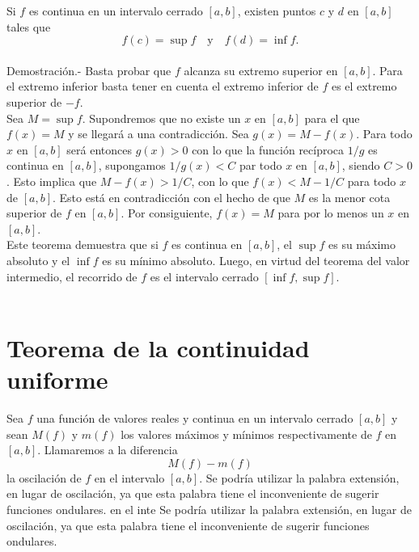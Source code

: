 \begin{teo}
    Si $f$ es continua en un intervalo cerrado $[a,b]$, existen puntos $c$ y $d$ en $[a,b]$ tales que
    $$f(c)=\sup f\quad \mbox{y}\quad f(d)=\inf f.$$\\
	Demostración.-\; Basta probar que $f$ alcanza su extremo superior en $[a,b]$. Para el extremo inferior basta tener en cuenta el extremo inferior de $f$ es el extremo superior de $-f$.\\
	Sea $M=\sup f$. Supondremos que no existe un $x$ en $[a,b]$ para el que $f(x)=M$ y se llegará a una contradicción. Sea $g(x)=M-f(x)$. Para todo $x$ en $[a,b]$ será entonces $g(x)>0$ con lo que la función recíproca $1/g$ es continua en $[a,b]$, supongamos $1/g(x)<C$ par todo $x$ en $[a,b]$, siendo $C>0$. Esto implica que $M-f(x)>1/C$, con lo que $f(x)<M-1/C$ para todo $x$ de $[a,b]$. Esto está en contradicción con el hecho de que $M$ es la menor cota superior de $f$ en $[a,b]$. Por consiguiente, $f(x)=M$ para por lo menos un $x$ en $[a,b]$.\\
	Este teorema demuestra que si $f$ es continua en $[a,b]$, el $\sup f$ es su máximo absoluto y el $\inf f$ es su mínimo absoluto. Luego, en virtud del teorema del valor intermedio, el recorrido de $f$ es el intervalo cerrado $[\inf f, \sup f]$.\\\\
\end{teo}

\section{Teorema de la continuidad uniforme}

    \begin{def.}
	Sea $f$ una función de valores reales y continua en un intervalo cerrado $[a,b]$ y sean $M(f)$ y $m(f)$ los valores máximos y mínimos respectivamente de $f$ en $[a,b]$. Llamaremos a la diferencia 
	$$M(f)-m(f)$$
	la oscilación de $f$ en el intervalo $[a,b]$. Se podría utilizar la palabra extensión, en lugar de oscilación, ya que esta palabra tiene el inconveniente de sugerir funciones ondulares. en el inte Se podría utilizar la palabra extensión, en lugar de oscilación, ya que esta palabra tiene el inconveniente de sugerir funciones ondulares.
    \end{def.}

